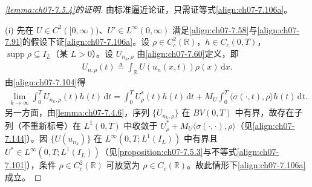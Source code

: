 \documentclass[../../main.tex]{subfiles}%
\begin{document}
\begin{proof}[\cref{lemma:ch07-7.5.4}的证明]
由标准逼近论证，只需证等式\eqref{align:ch07-7.106a}。

(i) 先在 $U\in C^2([0,\infty))$、$U'\in L^\infty(0,\infty)$ 满足\eqref{align:ch07-7.58}与\eqref{align:ch07-7.91}的假设下证\eqref{align:ch07-7.106a}。设 $\rho\in C^2_c(\mathbb{R})$，$h\in C_c(0,T)$，$\operatorname{supp}\rho\subseteq I_L$（某 $L>0$）。设 $U_{n_k,\rho}$ 由\eqref{align:ch07-7.60}定义，即
\begin{align*}
U_{n,\rho}(t)\triangleq \int_{\mathbb{R}}U(u_n(x,t))\rho(x)\,\mathrm{d}x.
\end{align*}
由\eqref{align:ch07-7.104}得
\begin{align}
\lim_{k\to\infty}\int_0^T U_{n_k,\rho}(t)h(t)\,\mathrm{d}t
=\int_0^T U_\rho^*(t)h(t)\,\mathrm{d}t+M_U\int_0^T\langle\sigma(\cdot,t),\rho\rangle h(t)\,\mathrm{d}t. \label{align:ch07-7.144}
\end{align}
另一方面，由\cref{lemma:ch07-7.4.6}，序列 $\{U_{n_k,\rho}\}$ 在 $BV(0,T)$ 中有界，故存在子列（不重新标号）在 $L^1(0,T)$ 中收敛于 $U_\rho^*+M_U\langle\sigma(\cdot,\cdot),\rho\rangle$（见\eqref{align:ch07-7.144}）。因 $\{U(u_{n_k})\}$ 在 $L^\infty(0,T;L^1(I_L))$ 中有界且 $U^*\in L^\infty(0,T;L^1(I_L))$（见\cref{proposition:ch07-7.5.3}与不等式\eqref{align:ch07-7.101}），条件 $\rho\in C^2_c(\mathbb{R})$ 可放宽为 $\rho\in C_c(\mathbb{R})$。故此情形下\eqref{align:ch07-7.106a}成立。


\end{proof}
\end{document}
